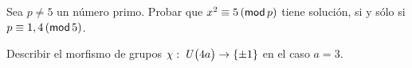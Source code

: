 % 

\begin{ejerEcuacion}
	Sea $p\neq 5$ un n\'umero primo. Probar que
	$x^2\equiv 5\tmodulo[p]$ tiene soluci\'on, si y s\'olo si
	$p\equiv 1,4\tmodulo[5]$.
\end{ejerEcuacion}

\begin{ejerEcuacion}
	Describir el morfismo de grupos
	$\chi:\,\Unidadesmod[4a]\rightarrow\{\pm1\}$ en el caso $a=3$.
\end{ejerEcuacion}
